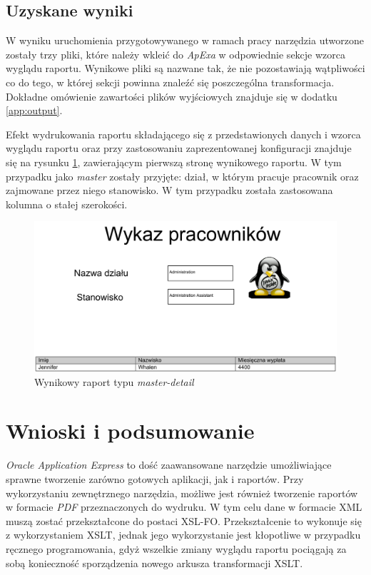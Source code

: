 \documentclass[11pt,a4paper]{article}
\begin{document}
\subsection{Uzyskane wyniki} \label{test:result}
W wyniku uruchomienia przygotowywanego w ramach pracy narzędzia utworzone zostały trzy pliki, które należy wkleić do \emph{ApExa} w odpowiednie sekcje wzorca wyglądu raportu. Wynikowe pliki są nazwane tak, że nie pozostawiają wątpliwości co do tego, w której sekcji powinna znaleźć się poszczególna transformacja. Dokładne omówienie zawartości plików wyjściowych znajduje się w dodatku \ref{app:output}.

Efekt wydrukowania raportu składającego się z przedstawionych danych i wzorca wyglądu raportu oraz przy zastosowaniu zaprezentowanej konfiguracji znajduje się na rysunku \ref{img:wynikowy}, zawierającym pierwszą stronę wynikowego raportu. W tym przypadku jako \emph{master} zostały przyjęte: dział, w którym pracuje pracownik oraz zajmowane przez niego stanowisko. W tym przypadku została zastosowana kolumna o stałej szerokości. 

\begin{figure}
\centering
\includegraphics[scale=0.5,angle=90]{test-md}
\caption{Wynikowy raport typu \emph{master-detail}}
\label{img:wynikowy}
\end{figure}


\clearpage


\section{Wnioski i podsumowanie}
\emph{Oracle Application Express} to dość zaawansowane narzędzie umożliwiające sprawne tworzenie zarówno gotowych aplikacji, jak i raportów. Przy wykorzystaniu zewnętrznego narzędzia, możliwe jest również tworzenie raportów w formacie \emph{PDF} przeznaczonych do wydruku. W tym celu dane w formacie XML muszą zostać przekształcone do postaci XSL-FO. Przekształcenie to wykonuje się z wykorzystaniem XSLT, jednak jego wykorzystanie jest kłopotliwe w przypadku ręcznego programowania, gdyż wszelkie zmiany wyglądu raportu pociągają za sobą konieczność sporządzenia nowego arkusza transformacji XSLT.
\end{document}
